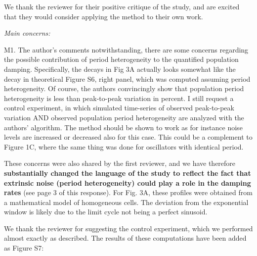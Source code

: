 \documentclass[11pt, letterpaper]{article}
\newenvironment{reviewer}{\itshape\color{gray}}{}
\begin{document}
We thank the reviewer for their positive critique of the study, and are excited that they would consider applying the method to their own work.

\begin{reviewer}
Main concerns:

M1. The author's comments notwithstanding, there are some concerns regarding the possible contribution of period heterogeneity to the quantified population damping. Specifically, the decays in Fig 3A actually looks somewhat like the decay in theoretical Figure S6, right panel, which was computed assuming period heterogeneity. Of course, the authors convincingly show that population period heterogeneity is less than peak-to-peak variation in percent. I still request a control experiment, in which simulated time-series of observed peak-to-peak variation AND observed population period heterogeneity are analyzed with the authors' algorithm. The method should be shown to work as for instance noise levels are increased or decreased also for this case. This could be a complement to Figure 1C, where the same thing was done for oscillators with identical period.
\end{reviewer}

These concerns were also shared by the first reviewer, and we have therefore {\bfseries substantially changed the language of the study to reflect the fact that extrinsic noise (period heterogeneity) could play a role in the damping rates} (see page 3 of this response).
For Fig. 3A, these profiles were obtained from a mathematical model of homogeneous cells.
The deviation from the exponential window is likely due to the limit cycle not being a perfect sinusoid.

We thank the reviewer for suggesting the control experiment, which we performed almost exactly as described. The results of these computations have been added as Figure S7:
\end{document}
